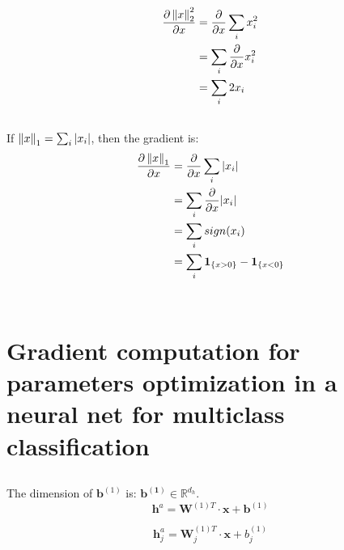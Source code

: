\documentclass[reqno]{amsart}
\theoremstyle{definition}
\theoremstyle{remark}
\numberwithin{equation}{section}
\begin{document}
\begin{align}
    \frac{\partial \left\lVert x\right\rVert^2_{2}}{\partial x} &= \frac{\partial}{\partial x} \sum_i x_i^2 \\
    &= \sum_i \frac{\partial}{\partial x} x_i^2 \\
    &= \sum_i 2x_i
\end{align}

\subsection{}

If $\left\lVert x\right\rVert_{1} = \sum_{i} |x_i|$, then the gradient is: \\

\begin{align}
    \frac{\partial \left\lVert x\right\rVert_{1}}{\partial x} &= \frac{\partial}{\partial x} \sum_i |x_i| \\
    &= \sum_i \frac{\partial}{\partial x} |x_i| \\
    &= \sum_i sign(x_i) \\
    &= \sum_i \textbf{1}_{\{x > 0\}} - \textbf{1}_{\{x < 0\}}
\end{align}\\

\section{Gradient computation for parameters optimization in a neural net for multiclass classification}

\subsection{}

The dimension of $\mathbf{b}^{(1)}$ is: $\mathbf{b^{(1)}} \in \mathbb{R}^{d_h}$. \\

\begin{equation}
    \mathbf{h}^a = \mathbf{W}^{(1)T} \cdot \mathbf{x} + \mathbf{b}^{(1)}
\end{equation}

\begin{equation}
    \mathbf{h}_j^a = \mathbf{W}_j^{(1)T} \cdot \mathbf{x} + b_j^{(1)}
\end{equation}
\end{document}
